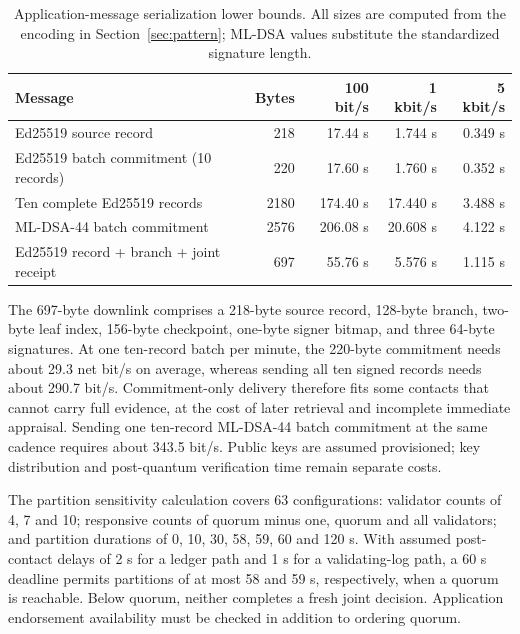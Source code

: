 \begin{table}[!htb]
\caption{Application-message serialization lower bounds. All sizes are computed from the encoding in Section~\ref{sec:pattern}; ML-DSA values substitute the standardized signature length.\label{tab:budget}}
\begin{tabularx}{\textwidth}{@{}Yrrrr@{}}
\toprule
\textbf{Message} & \textbf{Bytes} & \textbf{100 bit/s} & \textbf{1 kbit/s} & \textbf{5 kbit/s}\\
\midrule
Ed25519 source record & 218 & 17.44 s & 1.744 s & 0.349 s\\
Ed25519 batch commitment (10 records) & 220 & 17.60 s & 1.760 s & 0.352 s\\
Ten complete Ed25519 records & 2180 & 174.40 s & 17.440 s & 3.488 s\\
ML-DSA-44 batch commitment & 2576 & 206.08 s & 20.608 s & 4.122 s\\
Ed25519 record + branch + joint receipt & 697 & 55.76 s & 5.576 s & 1.115 s\\
\bottomrule
\end{tabularx}
\end{table}

The 697-byte downlink comprises a 218-byte source record, 128-byte branch, two-byte leaf index, 156-byte checkpoint, one-byte signer bitmap, and three 64-byte signatures. At one ten-record batch per minute, the 220-byte commitment needs about 29.3 net bit/s on average, whereas sending all ten signed records needs about 290.7 bit/s. Commitment-only delivery therefore fits some contacts that cannot carry full evidence, at the cost of later retrieval and incomplete immediate appraisal. Sending one ten-record ML-DSA-44 batch commitment at the same cadence requires about 343.5 bit/s. Public keys are assumed provisioned; key distribution and post-quantum verification time remain separate costs.

The partition sensitivity calculation covers 63 configurations: validator counts of 4, 7 and 10; responsive counts of quorum minus one, quorum and all validators; and partition durations of 0, 10, 30, 58, 59, 60 and 120 s. With assumed post-contact delays of 2 s for a ledger path and 1 s for a validating-log path, a 60 s deadline permits partitions of at most 58 and 59 s, respectively, when a quorum is reachable. Below quorum, neither completes a fresh joint decision. Application endorsement availability must be checked in addition to ordering quorum.
